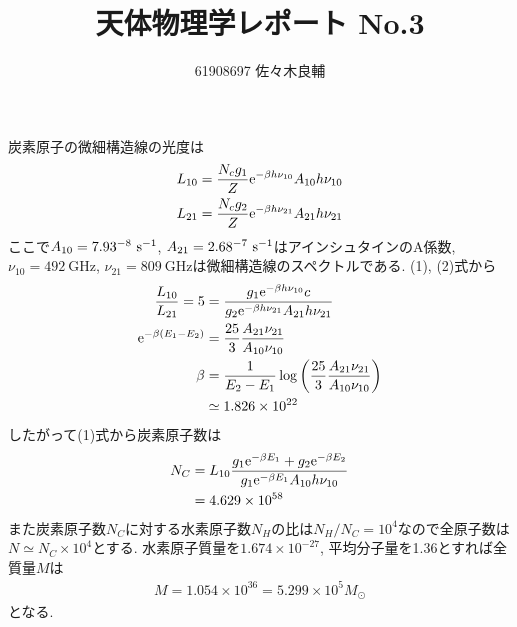 \documentclass[uplatex,a4j,11pt,dvipdfmx]{jsarticle}
\begin{document}
\title{天体物理学レポート No.3}
\author{61908697 佐々木良輔}
\date{}
\maketitle
炭素原子の微細構造線の光度は
\begin{align}
  L_{10}=\frac{N_cg_1}{Z}{\rm e}^{-\beta h\nu_{10}}A_{10}h\nu_{10}\\
  L_{21}=\frac{N_cg_2}{Z}{\rm e}^{-\beta h\nu_{21}}A_{21}h\nu_{21}
\end{align}
ここで$A_{10}=7.93\time10^{-8}\ \si{\second^{-1}}$, $A_{21}=2.68\time10^{-7}\ \si{\second^{-1}}$はアインシュタインのA係数,
$\nu_{10}=492\ \si{\giga\hertz}$, $\nu_{21}=809\ \si{\giga\hertz}$は微細構造線のスペクトルである.
(1), (2)式から
\begin{align}
  \begin{split}
    \frac{L_{10}}{L_{21}}=5&=\frac{g_1{\rm e}^{-\beta h\nu_{10}}c}{g_2{\rm e}^{-\beta h\nu_{21}}A_{21}h\nu_{21}}\\
    {\rm e}^{-\beta(E_1-E_2)}&=\frac{25}{3}\frac{A_{21}\nu_{21}}{A_{10}\nu_{10}}\\
    \beta&=\frac{1}{E_2-E_1}\log\left(\frac{25}{3}\frac{A_{21}\nu_{21}}{A_{10}\nu_{10}}\right)\\
    &\simeq1.826\times10^{22}
  \end{split}
\end{align}
したがって(1)式から炭素原子数は
\begin{align}
  \begin{split}
    N_C&=L_{10}\frac{g_1{\rm e}^{-\beta E_1}+g_2{\rm e}^{-\beta E_2}}{g_1{\rm e}^{-\beta E_1}A_{10}h\nu_{10}}\\
    &=4.629\times10^{58}
  \end{split}
\end{align}
また炭素原子数$N_C$に対する水素原子数$N_H$の比は$N_H/N_C=10^4$なので全原子数は$N\simeq N_C\times10^4$とする.
水素原子質量を$1.674\times10^{-27}$, 平均分子量を1.36とすれば全質量$M$は
\begin{align}
  M=1.054\times 10^{36}=5.299\times10^5 M_{\odot}
\end{align}
となる.
\end{document}
